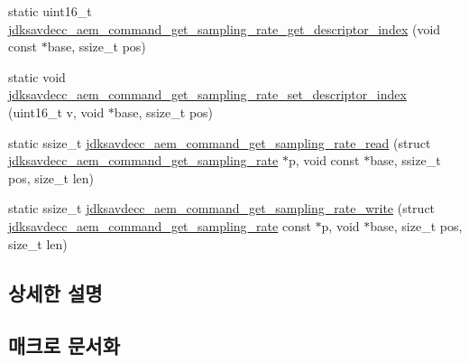 \begin{DoxyCompactItemize}
\item 
static uint16\+\_\+t \hyperlink{group__command__get__sampling__rate_gad1e45305f20725ae69504cd450fe9b70}{jdksavdecc\+\_\+aem\+\_\+command\+\_\+get\+\_\+sampling\+\_\+rate\+\_\+get\+\_\+descriptor\+\_\+index} (void const $\ast$base, ssize\+\_\+t pos)
\item 
static void \hyperlink{group__command__get__sampling__rate_ga7c93c161f963bf91b351995f8d72659c}{jdksavdecc\+\_\+aem\+\_\+command\+\_\+get\+\_\+sampling\+\_\+rate\+\_\+set\+\_\+descriptor\+\_\+index} (uint16\+\_\+t v, void $\ast$base, ssize\+\_\+t pos)
\item 
static ssize\+\_\+t \hyperlink{group__command__get__sampling__rate_ga407bfad591f7abaed5608ce957c6a547}{jdksavdecc\+\_\+aem\+\_\+command\+\_\+get\+\_\+sampling\+\_\+rate\+\_\+read} (struct \hyperlink{structjdksavdecc__aem__command__get__sampling__rate}{jdksavdecc\+\_\+aem\+\_\+command\+\_\+get\+\_\+sampling\+\_\+rate} $\ast$p, void const $\ast$base, ssize\+\_\+t pos, size\+\_\+t len)
\item 
static ssize\+\_\+t \hyperlink{group__command__get__sampling__rate_ga37a4b44d1dbd77b1a74cbb48cf158a7a}{jdksavdecc\+\_\+aem\+\_\+command\+\_\+get\+\_\+sampling\+\_\+rate\+\_\+write} (struct \hyperlink{structjdksavdecc__aem__command__get__sampling__rate}{jdksavdecc\+\_\+aem\+\_\+command\+\_\+get\+\_\+sampling\+\_\+rate} const $\ast$p, void $\ast$base, size\+\_\+t pos, size\+\_\+t len)
\end{DoxyCompactItemize}


\subsection{상세한 설명}


\subsection{매크로 문서화}
